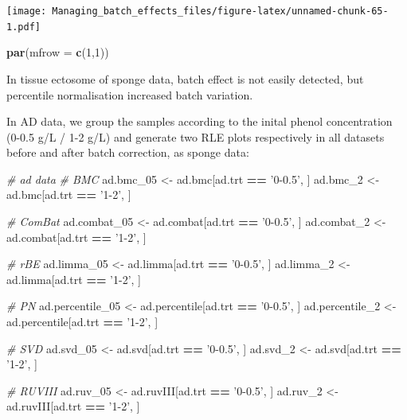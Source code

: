 \documentclass[]{book}
\newenvironment{Shaded}{\begin{snugshade}}{\end{snugshade}}
\newcommand{\KeywordTok}[1]{\textcolor[rgb]{0.13,0.29,0.53}{\textbf{#1}}}
\newcommand{\DataTypeTok}[1]{\textcolor[rgb]{0.13,0.29,0.53}{#1}}
\newcommand{\DecValTok}[1]{\textcolor[rgb]{0.00,0.00,0.81}{#1}}
\newcommand{\StringTok}[1]{\textcolor[rgb]{0.31,0.60,0.02}{#1}}
\newcommand{\CommentTok}[1]{\textcolor[rgb]{0.56,0.35,0.01}{\textit{#1}}}
\newcommand{\OperatorTok}[1]{\textcolor[rgb]{0.81,0.36,0.00}{\textbf{#1}}}
\newcommand{\NormalTok}[1]{#1}
\begin{document}
\texttt{[image: Managing\_batch\_effects\_files/figure-latex/unnamed-chunk-65-1.pdf]}

\begin{Shaded}
\begin{Highlighting}[]
\KeywordTok{par}\NormalTok{(}\DataTypeTok{mfrow =} \KeywordTok{c}\NormalTok{(}\DecValTok{1}\NormalTok{,}\DecValTok{1}\NormalTok{))}
\end{Highlighting}
\end{Shaded}

In tissue ectosome of sponge data, batch effect is not easily detected,
but percentile normalisation increased batch variation.

In AD data, we group the samples according to the inital phenol
concentration (0-0.5 g/L / 1-2 g/L) and generate two RLE plots
respectively in all datasets before and after batch correction, as
sponge data:

\begin{Shaded}
\begin{Highlighting}[]
\CommentTok{# ad data}
\CommentTok{# BMC}
\NormalTok{ad.bmc_}\DecValTok{05}\NormalTok{ <-}\StringTok{ }\NormalTok{ad.bmc[ad.trt }\OperatorTok{==}\StringTok{ '0-0.5'}\NormalTok{, ]}
\NormalTok{ad.bmc_}\DecValTok{2}\NormalTok{ <-}\StringTok{ }\NormalTok{ad.bmc[ad.trt }\OperatorTok{==}\StringTok{ '1-2'}\NormalTok{, ]}

\CommentTok{# ComBat}
\NormalTok{ad.combat_}\DecValTok{05}\NormalTok{ <-}\StringTok{ }\NormalTok{ad.combat[ad.trt }\OperatorTok{==}\StringTok{ '0-0.5'}\NormalTok{, ]}
\NormalTok{ad.combat_}\DecValTok{2}\NormalTok{ <-}\StringTok{ }\NormalTok{ad.combat[ad.trt }\OperatorTok{==}\StringTok{ '1-2'}\NormalTok{, ]}

\CommentTok{# rBE}
\NormalTok{ad.limma_}\DecValTok{05}\NormalTok{ <-}\StringTok{ }\NormalTok{ad.limma[ad.trt }\OperatorTok{==}\StringTok{ '0-0.5'}\NormalTok{, ]}
\NormalTok{ad.limma_}\DecValTok{2}\NormalTok{ <-}\StringTok{ }\NormalTok{ad.limma[ad.trt }\OperatorTok{==}\StringTok{ '1-2'}\NormalTok{, ]}

\CommentTok{# PN}
\NormalTok{ad.percentile_}\DecValTok{05}\NormalTok{ <-}\StringTok{ }\NormalTok{ad.percentile[ad.trt }\OperatorTok{==}\StringTok{ '0-0.5'}\NormalTok{, ]}
\NormalTok{ad.percentile_}\DecValTok{2}\NormalTok{ <-}\StringTok{ }\NormalTok{ad.percentile[ad.trt }\OperatorTok{==}\StringTok{ '1-2'}\NormalTok{, ]}

\CommentTok{# SVD}
\NormalTok{ad.svd_}\DecValTok{05}\NormalTok{ <-}\StringTok{ }\NormalTok{ad.svd[ad.trt }\OperatorTok{==}\StringTok{ '0-0.5'}\NormalTok{, ]}
\NormalTok{ad.svd_}\DecValTok{2}\NormalTok{ <-}\StringTok{ }\NormalTok{ad.svd[ad.trt }\OperatorTok{==}\StringTok{ '1-2'}\NormalTok{, ]}

\CommentTok{# RUVIII}
\NormalTok{ad.ruv_}\DecValTok{05}\NormalTok{ <-}\StringTok{ }\NormalTok{ad.ruvIII[ad.trt }\OperatorTok{==}\StringTok{ '0-0.5'}\NormalTok{, ]}
\NormalTok{ad.ruv_}\DecValTok{2}\NormalTok{ <-}\StringTok{ }\NormalTok{ad.ruvIII[ad.trt }\OperatorTok{==}\StringTok{ '1-2'}\NormalTok{, ]}
\end{Highlighting}
\end{Shaded}
\end{document}
